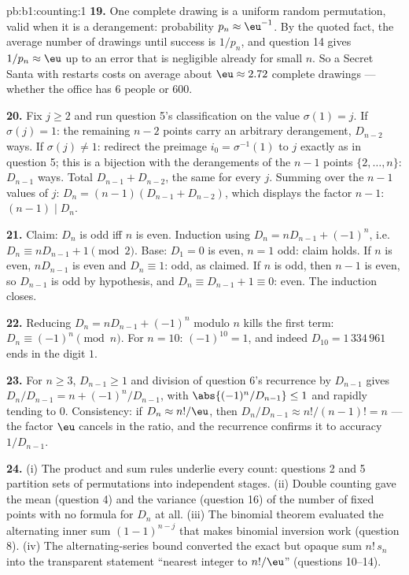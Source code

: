 \begin{solution}{pb:b1:counting:1}
\textbf{19.} One complete drawing is a uniform random permutation,
valid when it is a derangement: probability $p_n \approx \eu^{-1}$.
By the quoted fact, the average number of drawings until success is
$1/p_n$, and question 14 gives $1/p_n \approx \eu$ up to an error
that is negligible already for small $n$. So a Secret Santa with
restarts costs on average about $\eu \approx 2.72$ complete
drawings --- whether the office has $6$ people or $600$.

\textbf{20.} Fix $j \geq 2$ and run question 5's classification on
the value $\sigma(1) = j$. If $\sigma(j) = 1$: the remaining
$n - 2$ points carry an arbitrary derangement, $D_{n-2}$ ways. If
$\sigma(j) \neq 1$: redirect the preimage $i_0 = \sigma^{-1}(1)$ to
$j$ exactly as in question 5; this is a bijection with the
derangements of the $n - 1$ points $\{2, \dots, n\}$: $D_{n-1}$
ways. Total $D_{n-1} + D_{n-2}$, the same for every $j$. Summing
over the $n - 1$ values of $j$: $D_n = (n-1)(D_{n-1} + D_{n-2})$,
which displays the factor $n - 1$: $(n-1) \mid D_n$.

\textbf{21.} Claim: $D_n$ is odd iff $n$ is even. Induction using
$D_n = nD_{n-1} + (-1)^n$, i.e.\ $D_n \equiv nD_{n-1} + 1 \pmod 2$.
Base: $D_1 = 0$ is even, $n = 1$ odd: claim holds. If $n$ is even,
$nD_{n-1}$ is even and $D_n \equiv 1$: odd, as claimed. If $n$ is
odd, then $n - 1$ is even, so $D_{n-1}$ is odd by hypothesis, and
$D_n \equiv D_{n-1} + 1 \equiv 0$: even. The induction closes.

\textbf{22.} Reducing $D_n = nD_{n-1} + (-1)^n$ modulo $n$ kills
the first term: $D_n \equiv (-1)^n \pmod n$. For $n = 10$:
$(-1)^{10} = 1$, and indeed $D_{10} = 1\,334\,961$ ends in the
digit $1$.

\textbf{23.} For $n \geq 3$, $D_{n-1} \geq 1$ and division of
question 6's recurrence by $D_{n-1}$ gives $D_n/D_{n-1} = n +
(-1)^n/D_{n-1}$, with $\abs{(-1)^n/D_{n-1}} \leq 1$ and rapidly
tending to $0$. Consistency: if $D_n \approx n!/\eu$, then
$D_n/D_{n-1} \approx n!/(n-1)! = n$ --- the factor $\eu$ cancels
in the ratio, and the recurrence confirms it to accuracy
$1/D_{n-1}$.

\textbf{24.} (i) The product and sum rules underlie every count:
questions 2 and 5 partition sets of permutations into independent
stages. (ii) Double counting gave the mean (question 4) and the
variance (question 16) of the number of fixed points with no
formula for $D_n$ at all. (iii) The binomial theorem evaluated the
alternating inner sum $(1-1)^{n-j}$ that makes binomial inversion
work (question 8). (iv) The alternating-series bound converted the
exact but opaque sum $n!\,s_n$ into the transparent statement
``nearest integer to $n!/\eu$'' (questions 10--14).


\end{solution}
